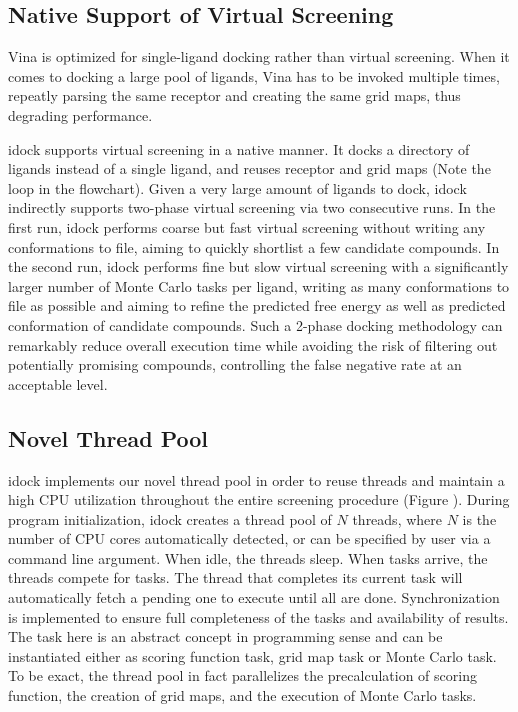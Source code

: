 \subsection{Native Support of Virtual Screening}

Vina is optimized for single-ligand docking rather than virtual screening. When it comes to docking a large pool of ligands, Vina has to be invoked multiple times, repeatly parsing the same receptor and creating the same grid maps, thus degrading performance.

idock supports virtual screening in a native manner. It docks a directory of ligands instead of a single ligand, and reuses receptor and grid maps (Note the loop in the flowchart). Given a very large amount of ligands to dock, idock indirectly supports two-phase virtual screening via two consecutive runs. In the first run, idock performs coarse but fast virtual screening without writing any conformations to file, aiming to quickly shortlist a few candidate compounds. In the second run, idock performs fine but slow virtual screening with a significantly larger number of Monte Carlo tasks per ligand, writing as many conformations to file as possible and aiming to refine the predicted free energy as well as predicted conformation of candidate compounds. Such a 2-phase docking methodology can remarkably reduce overall execution time while avoiding the risk of filtering out potentially promising compounds, controlling the false negative rate at an acceptable level.

\subsection{Novel Thread Pool}

idock implements our novel thread pool in order to reuse threads and maintain a high CPU utilization throughout the entire screening procedure (Figure ). During program initialization, idock creates a thread pool of $N$ threads, where $N$ is the number of CPU cores automatically detected, or can be specified by user via a command line argument. When idle, the threads sleep. When tasks arrive, the threads compete for tasks. The thread that completes its current task will automatically fetch a pending one to execute until all are done. Synchronization is implemented to ensure full completeness of the tasks and availability of results. The task here is an abstract concept in programming sense and can be instantiated either as scoring function task, grid map task or Monte Carlo task. To be exact, the thread pool in fact parallelizes the precalculation of scoring function, the creation of grid maps, and the execution of Monte Carlo tasks.

